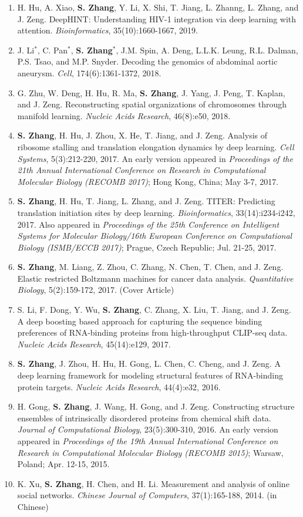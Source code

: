\documentclass[10pt]{article}
\makeatletter
\newlength{\bibhang}
\newlength{\bibsep}
 {\@listi \global\bibsep\itemsep \global\advance\bibsep by\parsep}
\newenvironment{bibsection}%
        {\begin{enumerate}{}{%
       \setlength{\leftmargin}{\bibhang}%
       \setlength{\itemindent}{-\leftmargin}%
       \setlength{\itemsep}{\bibsep}%
       \setlength{\parsep}{\z@}%
        \setlength{\partopsep}{0pt}%
        \setlength{\topsep}{0pt}}}
        {\end{enumerate}\vspace{-.6\baselineskip}}
\makeatother
\begin{document}
\begin{bibsection}
     \item H. Hu, A. Xiao, {\bf S. Zhang}, Y. Li, X. Shi, T. Jiang, L. Zhanng, L. Zhang, and J. Zeng. DeepHINT: Understanding HIV-1 integration via deep learning with attention. \emph{Bioinformatics}, 35(10):1660-1667, 2019.
     \item J. Li$^{*}$, C. Pan$^{*}$, {\bf S. Zhang}$^{*}$, J.M. Spin, A. Deng, L.L.K. Leung, R.L. Dalman, P.S. Tsao, and M.P. Snyder. Decoding the genomics of abdominal aortic aneurysm. \emph{Cell}, 174(6):1361-1372, 2018.
    \item G. Zhu, W. Deng, H. Hu, R. Ma, {\bf S. Zhang}, J. Yang, J. Peng, T. Kaplan, and J. Zeng. Reconstructing spatial organizations of chromosomes through manifold learning. \emph{Nucleic Acids Research}, 46(8):e50, 2018.
    \item {\bf S. Zhang}, H. Hu, J. Zhou, X. He, T. Jiang, and J. Zeng. Analysis of ribosome stalling and translation elongation dynamics by deep learning. \emph{Cell Systems}, 5(3):212-220, 2017. An early version appeared in \emph{Proceedings of the 21th Annual International Conference on Research in Computational Molecular Biology (RECOMB 2017)}; Hong Kong, China; May 3-7, 2017.
    \item {\bf S. Zhang}, H. Hu, T. Jiang, L. Zhang, and J. Zeng. TITER: Predicting translation initiation sites by deep learning. \emph{Bioinformatics}, 33(14):i234-i242, 2017. Also appeared in \emph{Proceedings of the 25th Conference on Intelligent Systems for Molecular Biology/16th European Conference on Computational Biology (ISMB/ECCB 2017)}; Prague, Czech Republic; Jul. 21-25, 2017.
    \item {\bf S. Zhang}, M. Liang, Z. Zhou, C. Zhang, N. Chen, T. Chen, and J. Zeng. Elastic restricted Boltzmann machines for cancer data analysis. \emph{Quantitative Biology}, 5(2):159-172, 2017. (Cover Article)
     \item S. Li, F. Dong, Y. Wu, {\bf S. Zhang}, C. Zhang, X. Liu, T. Jiang, and J. Zeng. A deep boosting based approach for capturing the sequence binding preferences of RNA-binding proteins from high-throughput CLIP-seq data. \emph{Nucleic Acids Research}, 45(14):e129, 2017.
    \item {\bf S. Zhang}, J. Zhou, H. Hu, H. Gong, L. Chen, C. Cheng, and J. Zeng. A deep learning framework for modeling structural features of RNA-binding protein targets. \emph{Nucleic Acids Research}, 44(4):e32, 2016.
    \item H. Gong, {\bf S. Zhang}, J. Wang, H. Gong, and J. Zeng. Constructing structure ensembles of intrinsically disordered proteins from chemical shift data. \emph{Journal of Computational Biology}, 23(5):300-310, 2016. An early version appeared in \emph{Proceedings of the 19th Annual International Conference on Research in Computational Molecular Biology (RECOMB 2015)}; Warsaw, Poland; Apr. 12-15, 2015.
    \item K. Xu, {\bf S. Zhang}, H. Chen, and H. Li. Measurement and analysis of online social networks. \emph{Chinese Journal of Computers}, 37(1):165-188, 2014. (in Chinese)
\end{bibsection}
\end{document}
